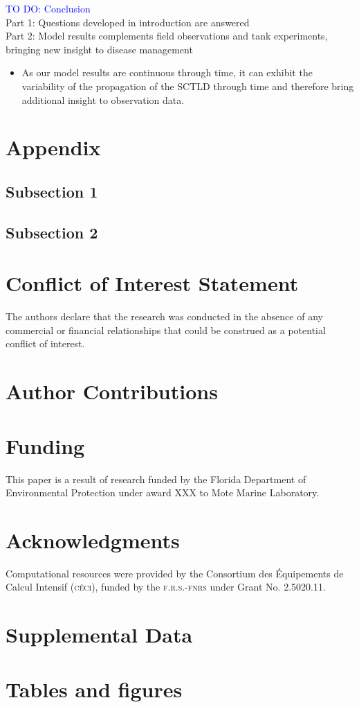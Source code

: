 \documentclass[utf8]{frontiersSCNS}
\begin{document}
\textcolor{blue}{TO DO: Conclusion} \\
Part 1: Questions developed in introduction are answered\\
Part 2: Model results complements field observations and tank experiments, bringing new insight to disease management
\begin{itemize}
    \item As our model results are continuous through time, it can exhibit the variability of the propagation of the SCTLD through time and therefore bring additional insight to observation data.
\end{itemize}
\section*{Appendix}

\subsection*{Subsection 1}
\subsection*{Subsection 2}

\section*{Conflict of Interest Statement}
The authors declare that the research was conducted in the absence of any commercial or financial relationships that could be construed as a potential conflict of interest.

\section*{Author Contributions}
  
\section*{Funding}
This paper is a result of research funded by the Florida Department of Environmental Protection under award XXX to Mote Marine Laboratory. 

\section*{Acknowledgments}
Computational resources were provided by the Consortium des \'Equipements de Calcul Intensif (\textsc{c\'eci}), funded by the \textsc{f.r.s.-fnrs} under Grant No. 2.5020.11.

\section*{Supplemental Data}

 



\section*{Tables and figures}
\end{document}
